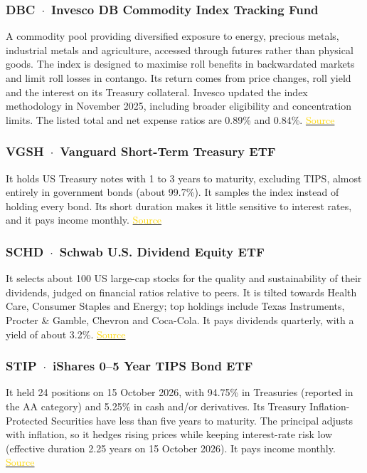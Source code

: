\documentclass[10pt,a4paper]{article}
\begin{document}
\subsubsection*{DBC \,$\cdot$\, Invesco DB Commodity Index Tracking Fund}
A commodity pool providing diversified exposure to energy, precious metals, industrial metals and agriculture,
accessed through futures rather than physical goods. The index is designed to maximise roll benefits in
backwardated markets and limit roll losses in contango. Its return comes from price changes, roll yield and
the interest on its Treasury collateral. Invesco updated the index methodology in November 2025, including broader eligibility and concentration limits. The listed total and net expense ratios are 0.89\% and 0.84\%.
\href{https://www.invesco.com/content/dam/invesco/us/en/product-documents/etf/fact-sheet/dbc-invesco-db-commodity-index-tracking-fund-fact-sheet.pdf}{\textcolor{gold}{Source}}

\subsubsection*{VGSH \,$\cdot$\, Vanguard Short-Term Treasury ETF}
It holds US Treasury notes with 1 to 3 years to maturity, excluding TIPS, almost entirely in government
bonds (about 99.7\%). It samples the index instead of holding every bond. Its short duration makes it
little sensitive to interest rates, and it pays income monthly.
\href{https://investor.vanguard.com/investment-products/etfs/profile/vgsh}{\textcolor{gold}{Source}}

\subsubsection*{SCHD \,$\cdot$\, Schwab U.S. Dividend Equity ETF}
It selects about 100 US large-cap stocks for the quality and sustainability of their dividends, judged on
financial ratios relative to peers. It is tilted towards Health Care, Consumer Staples and Energy; top holdings
include Texas Instruments, Procter \& Gamble, Chevron and Coca-Cola. It pays dividends quarterly, with a
yield of about 3.2\%.
\href{https://www.schwabassetmanagement.com/products/schd}{\textcolor{gold}{Source}}

\subsubsection*{STIP \,$\cdot$\, iShares 0--5 Year TIPS Bond ETF}
It held 24 positions on 15 October 2026, with 94.75\% in Treasuries (reported in the AA category) and 5.25\% in cash and/or derivatives. Its Treasury Inflation-Protected Securities have less than five years to maturity. The principal adjusts with inflation, so it hedges rising prices while keeping interest-rate risk low
(effective duration 2.25 years on 15 October 2026). It pays income monthly.
\href{https://www.blackrock.com/us/individual/products/239450/ishares-0-5-year-tips-bond-etf}{\textcolor{gold}{Source}}
\end{document}
